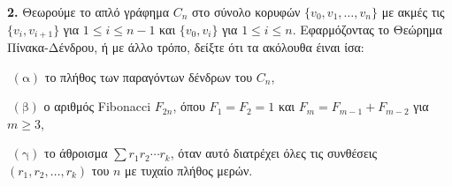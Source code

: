 \documentclass[oneside,a4paper]{article}
\newcommand {\tl}{\textlatin}
\begin{document}
\noindent \textbf{2.} Θεωρούμε το απλό γράφημα $C_n$ στο σύνολο κορυφών $\{v_0,v_1,\ldots,v_n\}$ με ακμές τις $\{v_i, v_{i+1}\}$ για $1\leq i \leq n-1$ και $\{v_0,v_i\}$ για $1\leq i \leq n$. Εφαρμόζοντας το Θεώρημα Πίνακα-Δένδρου, ή με άλλο τρόπο, δείξτε ότι τα ακόλουθα έιναι ίσα:

$ $\newline
$(\text{α})$ το πλήθος των παραγόντων δένδρων του $C_n$,

$ $\newline
$(\text{β})$ ο αριθμός \tl{Fibonacci} $F_{2n}$, όπου $F_1 = F_2 = 1$ και $F_m = F_{m-1} + F_{m-2}$ για $m\geq 3$,

$ $\newline
$(\text{γ})$ το άθροισμα $\sum r_1 r_2 \cdots r_k$, όταν αυτό διατρέχει όλες τις συνθέσεις $(r_1,r_2,\ldots, r_k)$ του $n$ με τυχαίο πλήθος μερών.

\vspace*{1cm}
\end{document}
